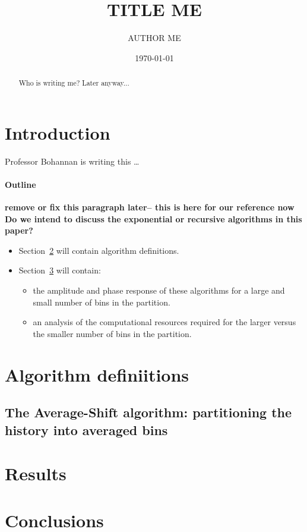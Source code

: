 \documentclass[12pt]{article}
\begin{document}
\title{TITLE ME}
\author{
       AUTHOR ME
}
\date{\today}

\maketitle

\begin{abstract}
Who is writing me? Later anyway...
\end{abstract}

\section{Introduction}
Professor Bohannan is writing this \ldots

\paragraph{Outline}
{\bf remove or fix this paragraph later-- this is here for our reference now} {\bf Do we intend to discuss the exponential or recursive algorithms in this paper?}
\begin{itemize} 
\item Section~\ref{algorithmDefn} will contain algorithm definitions. 
\item Section~\ref{results} will contain:
	\begin{itemize}
	\item  the amplitude and phase response of these algorithms for a large and small number of bins in the partition. 
	\item  an analysis of the computational resources required for the larger versus the smaller number of bins in the partition.
	\end{itemize}
\end{itemize}


\section{Algorithm definiitions}\label{algorithmDefn}

\subsection{The Average-Shift algorithm: partitioning the history into averaged bins}\label{algorithmDefn_avgShift}



\section{Results}\label{results}

\section{Conclusions}\label{conclusions}



\end{document}

